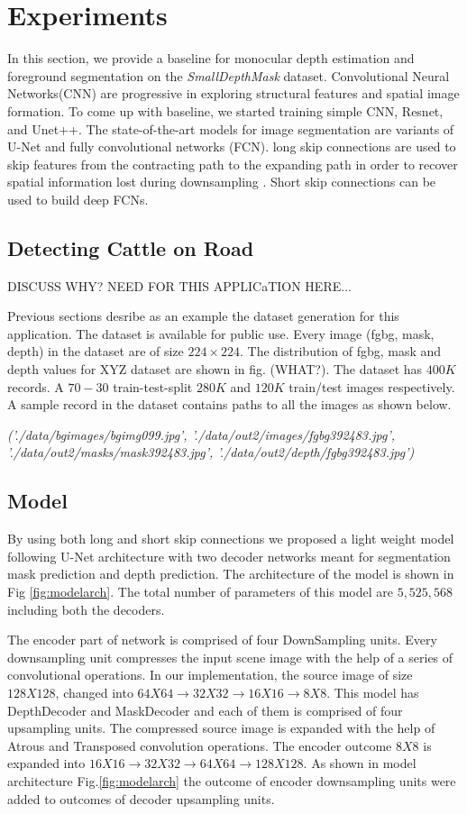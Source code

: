 \documentclass[review]{cvpr}
\begin{document}
\section{Experiments}
In this section, we provide a baseline for monocular depth estimation and foreground segmentation on the \textit{SmallDepthMask} dataset.
Convolutional Neural Networks(CNN) are progressive in exploring structural features and spatial image formation. 
To come up with baseline, we started  training simple CNN, Resnet, and Unet++. 
The state-of-the-art models for image segmentation are variants of U-Net and fully convolutional networks (FCN)\cite{drozdzal2016importance}. 
long skip connections are used to skip features from the contracting path to the expanding path in order to recover 
spatial information lost during downsampling \cite{zhou2019unet++}. Short skip connections can be used to build deep FCNs. 

\subsection{Detecting Cattle on Road}

DISCUSS WHY? NEED FOR THIS APPLICaTION HERE...

Previous sections desribe as an example the dataset generation for this application. The dataset is available for public use. Every image (fgbg, mask, depth) in the dataset are of size $224\times224$. The distribution of fgbg, mask and depth values for XYZ dataset are shown in fig. (WHAT?). The dataset has $400K$ records. A $70-30$ train-test-split $280K$ and $120K$ train/test images respectively. 
A sample record in the dataset contains paths to all the images as shown below.

\textit{('./data/bgimages/bgimg099.jpg', 
'./data/out2/images/fgbg392483.jpg', 
'./data/out2/masks/mask392483.jpg', 
'./data/out2/depth/fgbg392483.jpg')}

\subsection{Model}
By using both long and short skip connections we proposed a light weight model following U-Net architecture with two decoder 
networks meant for segmentation mask prediction and depth prediction. The architecture of the model is shown in Fig \ref{fig:modelarch}. 
The total number of parameters of this model are $5,525,568$ including both the decoders. 

The encoder part of network is comprised of four DownSampling units. Every downsampling unit compresses the input scene image with the help of a series of convolutional operations. In our implementation, the source image of size $128 X 128$, changed into $64X64 \rightarrow 32X32 \rightarrow  16X16 \rightarrow 8X8$. This model has DepthDecoder and MaskDecoder and each of them is comprised of four upsampling units. The compressed source image is expanded with the help of Atrous and Transposed convolution operations. The encoder outcome $8 X 8$ is expanded into $16X16 \rightarrow 32X32 \rightarrow 64X64 \rightarrow 128X128$. As shown in model architecture Fig.\ref{fig:modelarch} the outcome of encoder downsampling units were added to outcomes of decoder upsampling units.
\end{document}

